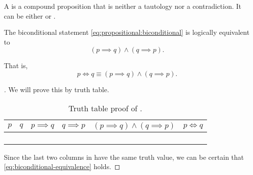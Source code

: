\begin{defn}[contingency]
  A  is a compound proposition
  that is neither a tautology nor a contradiction.
  It can be either \ltrue{} or \lfalse{}.
\end{defn}

\begin{theorem}
The biconditional statement \eqref{eq:propositional:biconditional}
is logically equivalent to
\begin{equation}
(p \implies q) \wedge (q \implies p).
\end{equation}

That is,
\begin{equation}
p \iff q \equiv (p \implies q) \wedge (q \implies p).
\label{eq:biconditional-equivalence}
\end{equation}
\label{th:biconditional-equivalence}
\end{theorem}

\begin{proof}[]
We will prove this by truth table.
\begin{table}[H]
  \centering
    \begin{tabular}{llrrrr}
      \toprule
      $p$ & $q$ & $p \implies q$ & $q \implies p $ & $(p \implies q) \land (q \implies p)$ & $p \iff q$ \\ \midrule
      \lfalse{} & \lfalse{} & \ltrue{}      & \ltrue{}             & \ltrue{}  & \ltrue{}    \\
      \lfalse{} & \ltrue{} & \ltrue{}      & \lfalse{}             & \lfalse{}  & \lfalse{}    \\
      \ltrue{} & \lfalse{} & \lfalse{}      & \ltrue{}             & \lfalse{}  & \lfalse{}    \\
      \ltrue{} & \ltrue{} & \ltrue{}      & \ltrue{}             & \ltrue{}  & \ltrue{}    \\
      \bottomrule
    \end{tabular}
  \caption{Truth table proof of .}
  \label{tab:propositional:proof:bicond-equiv}
\end{table}
Since the last two columns in
have the same truth value, we can be certain that
\eqref{eq:biconditional-equivalence}
holds.
\end{proof}

